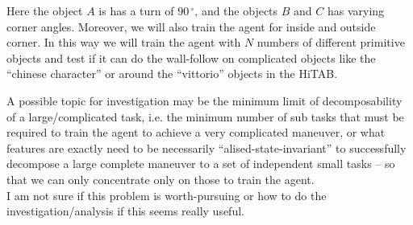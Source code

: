\documentclass{article}
\begin{document}
Here the object $A$ is has a turn of $90\,^{\circ}$, and the objects $B$ and $C$ has varying corner angles. Moreover, we will also train the agent for inside and outside corner. In this way we will train the agent with $N$ numbers of different primitive objects and test if it can do the wall-follow on complicated objects like the ``chinese character'' or around the ``vittorio'' objects in the HiTAB. 

A possible topic for investigation may be the minimum limit of decomposability of a large/complicated task, i.e. the minimum number of sub tasks that must be required to train the agent to achieve a very complicated maneuver, or what features are exactly need to be necessarily ``alised-state-invariant'' to successfully decompose a large complete maneuver to a set of independent small tasks -- so that we can only concentrate only on those to train the agent. 
\\

I am not sure if this problem is worth-pursuing or how to do the investigation/analysis if this seems really useful.
\end{document}
